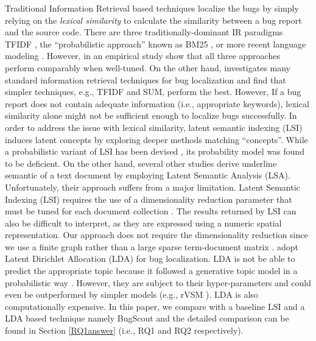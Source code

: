 \documentclass[conference]{IEEEtran}
\begin{document}
Traditional Information Retrieval based techniques localize the bugs by simply relying on the \emph{lexical similarity} to calculate the similarity between a bug report and the source code. 
There are three traditionally-dominant IR paradigms TFIDF \cite{Salton}, the “probabilistic approach” known as BM25 \cite{Robertson}, or more recent language modeling \cite{Ponte}. However, in an empirical study \citet{Fang} show that all three approaches perform comparably when well-tuned. On the other hand, \citet{Rao} investigates many standard information retrieval techniques for bug localization and find that simpler techniques, e.g., TFIDF and SUM, perform the best. However, If a bug report does not contain adequate information (i.e., appropriate keywords), lexical similarity alone might not be sufficient enough to localize bugs successfully. In order to address the issue with lexical similarity, 
latent semantic indexing (LSI) induces latent concepts by exploring deeper methods matching “concepts”. While a probabilistic variant of LSI has been devised \cite{Hofmann}, its probability model was found to be deficient. On the other hand, several other studies \cite{Maletic, MarcusMaletic,irmarcus} derive underline semantic of a text document by employing Latent Semantic Analysis (LSA).
Unfortunately, their approach suffers from a major limitation.
Latent Semantic Indexing (LSI) requires the use of a dimensionality reduction parameter that must be tuned for each document collection \cite{Kontostathis}.
The results returned by LSI can also be difficult to interpret, as
they are expressed using a numeric spatial representation.
Our approach does not require the dimensionality reduction since we use a finite graph rather than a large sparse term-document matrix \cite{MarcusLSI,MarcusMaletic}.
\citet{LukinsBL,Nguyen} adopt Latent Dirichlet Allocation (LDA) for bug localization. LDA is not be able to predict the appropriate topic because it followed a generative topic model in a probabilistic way \cite{Lukins}. However, they are subject to their hyper-parameters and could even be outperformed by simpler models (e.g., rVSM \cite{Jian}).  
LDA is also computationally expensive. In this paper, we compare with a baseline LSI \cite{MarcusLSI} and a LDA based technique namely BugScout \cite{Nguyen} and the detailed comparison can be found in Section \ref{RQ1answer} (i.e., RQ1 and RQ2 respectively).
\end{document}
